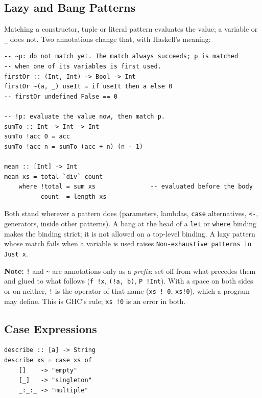 \documentclass[11pt,a4paper]{article}
\newenvironment{note}{%
  \def\FrameCommand{\fboxsep=3mm \colorbox{notebg}}%
  \MakeFramed{\advance\hsize-\width \FrameRestore}%
  \noindent\textbf{Note:} }%
  {\endMakeFramed}
\begin{document}
\subsection{Lazy and Bang Patterns}

Matching a constructor, tuple or literal pattern evaluates the value;
a variable or \texttt{\_} does not.  Two annotations change that, with
Haskell's meaning:

\begin{lstlisting}
-- ~p: do not match yet. The match always succeeds; p is matched
-- when one of its variables is first used.
firstOr :: (Int, Int) -> Bool -> Int
firstOr ~(a, _) useIt = if useIt then a else 0
-- firstOr undefined False == 0

-- !p: evaluate the value now, then match p.
sumTo :: Int -> Int -> Int
sumTo !acc 0 = acc
sumTo !acc n = sumTo (acc + n) (n - 1)

mean :: [Int] -> Int
mean xs = total `div` count
    where !total = sum xs               -- evaluated before the body
          count  = length xs
\end{lstlisting}

Both stand wherever a pattern does (parameters, lambdas, \texttt{case}
alternatives, \texttt{<-}, generators, inside other patterns).  A bang
at the head of a \texttt{let} or \texttt{where} binding makes the
binding strict; it is not allowed on a top-level binding.  A lazy
pattern whose match fails when a variable is used raises
\texttt{Non-exhaustive patterns in Just x}.

\begin{note}
\texttt{!} and \texttt{\textasciitilde{}} are annotations only as a
\emph{prefix}: set off from what precedes them and glued to what
follows (\texttt{f !x}, \texttt{(!a, b)}, \texttt{P !Int}).  With a
space on both sides or on neither, \texttt{!} is the operator of that
name (\texttt{xs ! 0}, \texttt{xs!0}), which a program may define.  This
is GHC's rule; \texttt{xs !0} is an error in both.
\end{note}

\subsection{Case Expressions}

\begin{lstlisting}
describe :: [a] -> String
describe xs = case xs of
    []    -> "empty"
    [_]   -> "singleton"
    _:_:_ -> "multiple"
\end{lstlisting}
\end{document}
